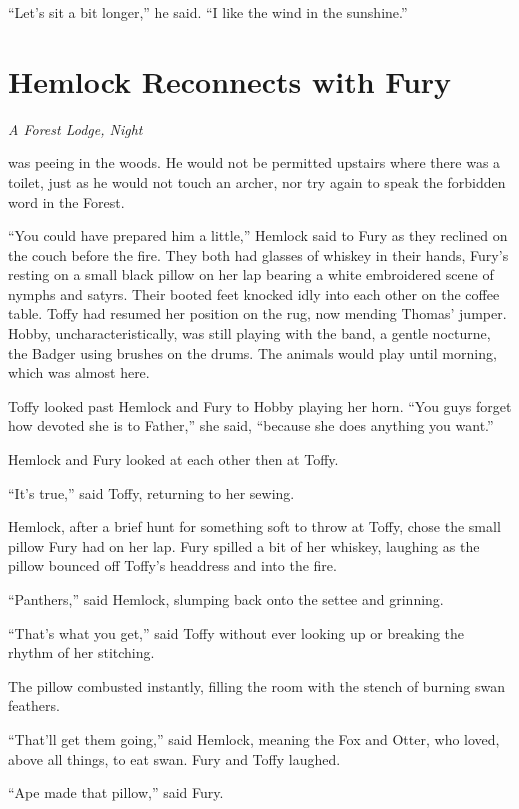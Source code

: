 \documentclass[11pt,a5paper]{article}
\newcommand{\alet}[1]{\textit{#1}\vspace{1em}}
\begin{document}
``Let's sit a bit longer,'' he said. ``I like the wind in the sunshine.''

\newpage

\section{Hemlock Reconnects with Fury}

\alet{A Forest Lodge, Night}

 was peeing in the woods. He would not be permitted upstairs where there was a toilet, just as he would not touch an archer, nor try again to speak the forbidden word in the Forest.

``You could have prepared him a little,'' Hemlock said to Fury as they reclined on the couch before the fire. They both had glasses of whiskey in their hands, Fury's resting on a small black pillow on her lap bearing a white embroidered scene of nymphs and satyrs. Their booted feet knocked idly into each other on the coffee table. Toffy had resumed her position on the rug, now mending Thomas' jumper. Hobby, uncharacteristically, was still playing with the band, a gentle nocturne, the Badger using brushes on the drums. The animals would play until morning, which was almost here.

Toffy looked past Hemlock and Fury to Hobby playing her horn. ``You guys forget how devoted she is to Father,'' she said, ``because she does anything you want.''

Hemlock and Fury looked at each other then at Toffy.

``It's true,'' said Toffy, returning to her sewing.

Hemlock, after a brief hunt for something soft to throw at Toffy, chose the small pillow Fury had on her lap. Fury spilled a bit of her whiskey, laughing as the pillow bounced off Toffy's headdress and into the fire.

``Panthers,'' said Hemlock, slumping back onto the settee and grinning.

``That's what you get,'' said Toffy without ever looking up or breaking the rhythm of her stitching.

The pillow combusted instantly, filling the room with the stench of burning swan feathers.

``That'll get them going,'' said Hemlock, meaning the Fox and Otter, who loved, above all things, to eat swan. Fury and Toffy laughed.

``Ape made that pillow,'' said Fury.
\end{document}
